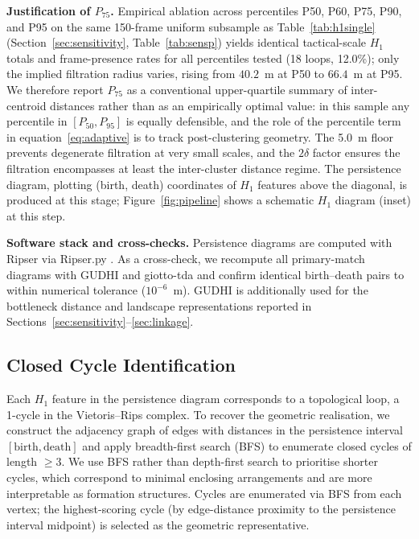 \textbf{Justification of \(P_{75}\).} Empirical ablation across percentiles P50, P60, P75, P90, and P95 on the same 150-frame uniform subsample as Table~\ref{tab:h1single} (Section~\ref{sec:sensitivity}, Table~\ref{tab:sensp}) yields identical tactical-scale \(H_1\) totals and frame-presence rates for all percentiles tested (18 loops, 12.0\%); only the implied filtration radius varies, rising from \(40.2\)~m at P50 to \(66.4\)~m at P95. We therefore report \(P_{75}\) as a conventional upper-quartile summary of inter-centroid distances rather than as an empirically optimal value: in this sample any percentile in \([P_{50}, P_{95}]\) is equally defensible, and the role of the percentile term in equation~\eqref{eq:adaptive} is to track post-clustering geometry. The 5.0~m floor prevents degenerate filtration at very small scales, and the \(2\delta\) factor ensures the filtration encompasses at least the inter-cluster distance regime. The persistence diagram, plotting (birth, death) coordinates of \(H_1\) features above the diagonal, is produced at this stage; Figure~\ref{fig:pipeline} shows a schematic \(H_1\) diagram (inset) at this step.

\textbf{Software stack and cross-checks.} Persistence diagrams are computed with Ripser via Ripser.py \citep{Bauer2021,Tralie2018}. As a cross-check, we recompute all primary-match diagrams with GUDHI and giotto-tda \citep{Tauzin2021} and confirm identical birth--death pairs to within numerical tolerance ($10^{-6}$~m). GUDHI is additionally used for the bottleneck distance and landscape representations reported in Sections~\ref{sec:sensitivity}--\ref{sec:linkage}.

\subsection{Closed Cycle Identification}

Each \(H_1\) feature in the persistence diagram corresponds to a topological loop, a 1-cycle in the Vietoris--Rips complex. To recover the geometric realisation, we construct the adjacency graph of edges with distances in the persistence interval \([\text{birth},\text{death}]\) and apply breadth-first search (BFS) to enumerate closed cycles of length \(\geq 3\). We use BFS rather than depth-first search to prioritise shorter cycles, which correspond to minimal enclosing arrangements and are more interpretable as formation structures. Cycles are enumerated via BFS from each vertex; the highest-scoring cycle (by edge-distance proximity to the persistence interval midpoint) is selected as the geometric representative.

